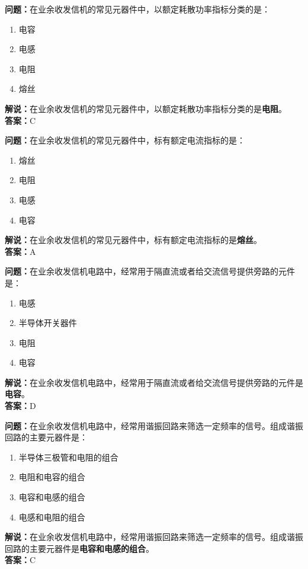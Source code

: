 \bigskip


\noindent\textbf{问题：}在业余收发信机的常见元器件中，以额定耗散功率指标分类的是：
\begin{enumerate}[label=\Alph*), leftmargin=3em]
\item 电容
\item 电感
\item 电阻
\item 熔丝
\end{enumerate}
\noindent\textbf{解说：}在业余收发信机的常见元器件中，以额定耗散功率指标分类的是\textbf{电阻}。\\\noindent\textbf{答案：}C

\bigskip


\noindent\textbf{问题：}在业余收发信机的常见元器件中，标有额定电流指标的是：
\begin{enumerate}[label=\Alph*), leftmargin=3em]
\item 熔丝
\item 电阻
\item 电感
\item 电容
\end{enumerate}
\noindent\textbf{解说：}在业余收发信机的常见元器件中，标有额定电流指标的是\textbf{熔丝}。\\\noindent\textbf{答案：}A


\bigskip


\noindent\textbf{问题：}在业余收发信机电路中，经常用于隔直流或者给交流信号提供旁路的元件是：
\begin{enumerate}[label=\Alph*), leftmargin=3em]
\item 电感
\item 半导体开关器件
\item 电阻
\item 电容
\end{enumerate}
\noindent\textbf{解说：}在业余收发信机电路中，经常用于隔直流或者给交流信号提供旁路的元件是\textbf{电容}。\\\noindent\textbf{答案：}D

\bigskip


\noindent\textbf{问题：}在业余收发信机电路中，经常用谐振回路来筛选一定频率的信号。组成谐振回路的主要元器件是：
\begin{enumerate}[label=\Alph*), leftmargin=3em]
\item 半导体三极管和电阻的组合
\item 电阻和电容的组合
\item 电容和电感的组合
\item 电感和电阻的组合
\end{enumerate}
\noindent\textbf{解说：}在业余收发信机电路中，经常用谐振回路来筛选一定频率的信号。组成谐振回路的主要元器件是\textbf{电容和电感的组合}。\\\noindent\textbf{答案：}C



